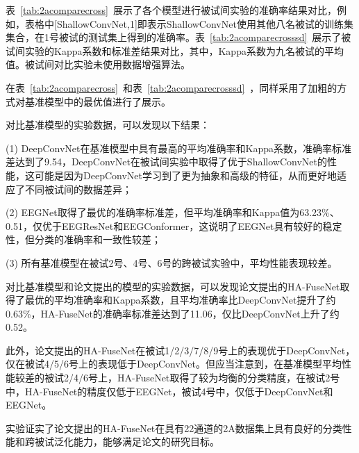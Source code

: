 表~\ref{tab:2acomparecross}~展示了各个模型进行被试间实验的准确率结果对比，例如，表格中[ShallowConvNet,1]即表示ShallowConvNet使用其他八名被试的训练集集合，在1号被试的测试集上得到的准确率。表~\ref{tab:2acomparecrosssd}~展示了被试间实验的Kappa系数和标准差结果对比，其中，Kappa系数为九名被试的平均值。被试间对比实验未使用数据增强算法。

在表~\ref{tab:2acomparecross}~和表~\ref{tab:2acomparecrosssd}~，同样采用了加粗的方式对基准模型中的最优值进行了展示。

对比基准模型的实验数据，可以发现以下结果：

(1) DeepConvNet在基准模型中具有最高的平均准确率和Kappa系数，准确率标准差达到了9.54，DeepConvNet在被试间实验中取得了优于ShallowConvNet的性能，这可能是因为DeepConvNet学习到了更为抽象和高级的特征，从而更好地适应了不同被试间的数据差异；

(2) EEGNet取得了最优的准确率标准差，但平均准确率和Kappa值为63.23\%、0.51，仅优于EEGResNet和EEGConformer，这说明了EEGNet具有较好的稳定性，但分类的准确率和一致性较差；

(3) 所有基准模型在被试2号、4号、6号的跨被试实验中，平均性能表现较差。

对比基准模型和论文提出的模型的实验数据，可以发现论文提出的HA-FuseNet取得了最优的平均准确率和Kappa系数，且平均准确率比DeepConvNet提升了约0.63\%，HA-FuseNet的准确率标准差达到了11.06，仅比DeepConvNet上升了约0.52。

此外，论文提出的HA-FuseNet在被试1/2/3/7/8/9号上的表现优于DeepConvNet，仅在被试4/5/6号上的表现低于DeepConvNet。但应当注意到，在基准模型平均性能较差的被试2/4/6号上，HA-FuseNet取得了较为均衡的分类精度，在被试2号中，HA-FuseNet的精度仅低于EEGNet，被试4号中，仅低于DeepConvNet和EEGNet。

实验证实了论文提出的HA-FuseNet在具有22通道的2A数据集上具有良好的分类性能和跨被试泛化能力，能够满足论文的研究目标。


